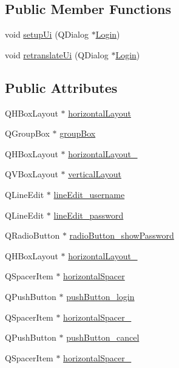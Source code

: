 \subsection*{Public Member Functions}
\begin{DoxyCompactItemize}
\item 
void \hyperlink{class_ui___login_abf948ae577c8b92bed6c2ab9370042d1}{setup\+Ui} (Q\+Dialog $\ast$\hyperlink{class_login}{Login})
\item 
void \hyperlink{class_ui___login_a049b51d8500e9cd762f272fabaeb7b12}{retranslate\+Ui} (Q\+Dialog $\ast$\hyperlink{class_login}{Login})
\end{DoxyCompactItemize}
\subsection*{Public Attributes}
\begin{DoxyCompactItemize}
\item 
Q\+H\+Box\+Layout $\ast$ \hyperlink{class_ui___login_a884014ffea8d10db8bdf470683c833b6}{horizontal\+Layout}
\item 
Q\+Group\+Box $\ast$ \hyperlink{class_ui___login_a84554aaa2aa0a78ab0403ff8dc23aaaf}{group\+Box}
\item 
Q\+H\+Box\+Layout $\ast$ \hyperlink{class_ui___login_ab3cbd584533eb0a14ad3d0bbb2db2da5}{horizontal\+Layout\+\_}
\item 
Q\+V\+Box\+Layout $\ast$ \hyperlink{class_ui___login_ab770d0e4cc355110c9fc4e759ac39555}{vertical\+Layout}
\item 
Q\+Line\+Edit $\ast$ \hyperlink{class_ui___login_a15d68638bda0d3580734e058c3c92759}{line\+Edit\+\_\+username}
\item 
Q\+Line\+Edit $\ast$ \hyperlink{class_ui___login_aa89e026753853b98c56b076f17d41c5d}{line\+Edit\+\_\+password}
\item 
Q\+Radio\+Button $\ast$ \hyperlink{class_ui___login_a36a46d07851521c2ae6941443750c386}{radio\+Button\+\_\+show\+Password}
\item 
Q\+H\+Box\+Layout $\ast$ \hyperlink{class_ui___login_a2b611d229ad37bb44ac51004e39c78ee}{horizontal\+Layout\+\_}
\item 
Q\+Spacer\+Item $\ast$ \hyperlink{class_ui___login_ab3a336bfebd74b1ca39df229c455a6c4}{horizontal\+Spacer}
\item 
Q\+Push\+Button $\ast$ \hyperlink{class_ui___login_a10184ff8af3cd52734ae67ba901aa4d0}{push\+Button\+\_\+login}
\item 
Q\+Spacer\+Item $\ast$ \hyperlink{class_ui___login_ad47b558e587da2f8de8bffc3f18c8978}{horizontal\+Spacer\+\_}
\item 
Q\+Push\+Button $\ast$ \hyperlink{class_ui___login_ac522c6af8c933e1c28abe471a249cd1d}{push\+Button\+\_\+cancel}
\item 
Q\+Spacer\+Item $\ast$ \hyperlink{class_ui___login_a9841bc87e41dd223c43b0bebeb921b7e}{horizontal\+Spacer\+\_}
\end{DoxyCompactItemize}


